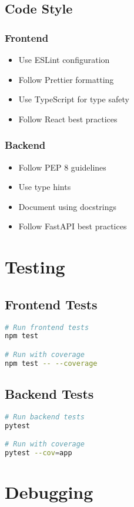 \subsection{Code Style}
\subsubsection{Frontend}
\begin{itemize}
    \item Use ESLint configuration
    \item Follow Prettier formatting
    \item Use TypeScript for type safety
    \item Follow React best practices
\end{itemize}

\subsubsection{Backend}
\begin{itemize}
    \item Follow PEP 8 guidelines
    \item Use type hints
    \item Document using docstrings
    \item Follow FastAPI best practices
\end{itemize}

\section{Testing}
\subsection{Frontend Tests}
\begin{lstlisting}[language=bash]
# Run frontend tests
npm test

# Run with coverage
npm test -- --coverage
\end{lstlisting}

\subsection{Backend Tests}
\begin{lstlisting}[language=bash]
# Run backend tests
pytest

# Run with coverage
pytest --cov=app
\end{lstlisting}

\section{Debugging}
